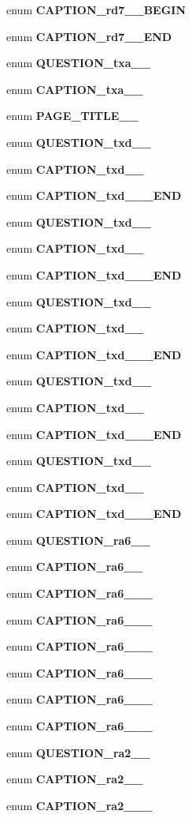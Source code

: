 \begin{CompactItemize}
enum {\bf CAPTION\_\-rd7\_\_\-BEGIN} 
\item 
enum {\bf CAPTION\_\-rd7\_\_\-END} 
\item 
enum {\bf QUESTION\_\-txa\_\_\-} 
\item 
enum {\bf CAPTION\_\-txa\_\_\-} 
\item 
enum {\bf PAGE\_\-TITLE\_\_\-} 
\item 
enum {\bf QUESTION\_\-txd\_\_\-} 
\item 
enum {\bf CAPTION\_\-txd\_\_\-} 
\item 
enum {\bf CAPTION\_\-txd\_\_\-\_\-END} 
\item 
enum {\bf QUESTION\_\-txd\_\_\-} 
\item 
enum {\bf CAPTION\_\-txd\_\_\-} 
\item 
enum {\bf CAPTION\_\-txd\_\_\-\_\-END} 
\item 
enum {\bf QUESTION\_\-txd\_\_\-} 
\item 
enum {\bf CAPTION\_\-txd\_\_\-} 
\item 
enum {\bf CAPTION\_\-txd\_\_\-\_\-END} 
\item 
enum {\bf QUESTION\_\-txd\_\_\-} 
\item 
enum {\bf CAPTION\_\-txd\_\_\-} 
\item 
enum {\bf CAPTION\_\-txd\_\_\-\_\-END} 
\item 
enum {\bf QUESTION\_\-txd\_\_\-} 
\item 
enum {\bf CAPTION\_\-txd\_\_\-} 
\item 
enum {\bf CAPTION\_\-txd\_\_\-\_\-END} 
\item 
enum {\bf QUESTION\_\-ra6\_\_\-} 
\item 
enum {\bf CAPTION\_\-ra6\_\_\-} 
\item 
enum {\bf CAPTION\_\-ra6\_\_\-\_} 
\item 
enum {\bf CAPTION\_\-ra6\_\_\-\_} 
\item 
enum {\bf CAPTION\_\-ra6\_\_\-\_} 
\item 
enum {\bf CAPTION\_\-ra6\_\_\-\_} 
\item 
enum {\bf CAPTION\_\-ra6\_\_\-\_} 
\item 
enum {\bf CAPTION\_\-ra6\_\_\-\_} 
\item 
enum {\bf QUESTION\_\-ra2\_\_\-} 
\item 
enum {\bf CAPTION\_\-ra2\_\_\-} 
\item 
enum {\bf CAPTION\_\-ra2\_\_\-\_} 

\end{CompactItemize}
